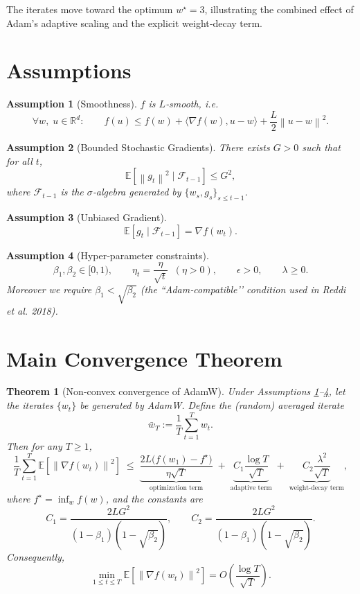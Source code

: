 \documentclass{article}
\newtheorem{assumption}{Assumption}
\newtheorem{theorem}{Theorem}
\newcommand{\EE}{\mathbb{E}}
\newcommand{\RR}{\mathbb{R}}
\newcommand{\norm}[1]{\left\|#1\right\|}
\begin{document}
The iterates move toward the optimum $w^\star=3$, illustrating the combined effect of Adam’s adaptive scaling and the explicit weight‑decay term.

\newpage
\section*{Assumptions}
\begin{assumption}[Smoothness]\label{ass:smooth}
$f$ is $L$‑smooth, i.e.
\[
    \forall w,\; u\in\RR^{d}:\qquad 
    f(u)\le f(w)+\langle \nabla f(w),u-w\rangle +\frac{L}{2}\norm{u-w}^{2}.
\]
\end{assumption}
\begin{assumption}[Bounded Stochastic Gradients]\label{ass:bound}
There exists $G>0$ such that for all $t$,
\[
    \EE\!\left[\norm{g_t}^{2}\mid\mathcal{F}_{t-1}\right]\le G^{2},
\]
where $\mathcal{F}_{t-1}$ is the $\sigma$‑algebra generated by $\{w_s,g_s\}_{s\le t-1}$.
\end{assumption}
\begin{assumption}[Unbiased Gradient]\label{ass:unbiased}
\[
    \EE\!\left[g_t\mid\mathcal{F}_{t-1}\right]=\nabla f(w_t).
\]
\end{assumption}
\begin{assumption}[Hyper‑parameter constraints]\label{ass:hyper}
\[
    \beta_1,\beta_2\in[0,1),\qquad
    \eta_t = \frac{\eta}{\sqrt{t}}\;\;( \eta>0),\qquad
    \epsilon>0,\qquad
    \lambda\ge0.
\]
Moreover we require $ \beta_1 < \sqrt{\beta_2}$ (the “Adam‑compatible’’ condition used in Reddi \emph{et al.} 2018).
\end{assumption}

\section*{Main Convergence Theorem}
\begin{theorem}[Non‑convex convergence of AdamW]\label{thm:adamw}
Under Assumptions \ref{ass:smooth}–\ref{ass:hyper}, let the iterates $\{w_t\}$ be generated by AdamW. Define the (random) averaged iterate
\[
    \bar w_T:=\frac{1}{T}\sum_{t=1}^{T} w_t .
\]
Then for any $T\ge 1$,
\[
    \frac{1}{T}\sum_{t=1}^{T}\EE\!\left[\norm{\nabla f(w_t)}^{2}\right]
    \;\le\;
    \underbrace{\frac{2L\bigl(f(w_1)-f^\star\bigr)}{\eta\sqrt{T}}}_{\text{optimization term}}
    \;+\;
    \underbrace{C_1\frac{\log T}{\sqrt{T}}}_{\text{adaptive term}}
    \;+\;
    \underbrace{C_2\frac{\lambda^{2}}{\sqrt{T}}}_{\text{weight‑decay term}},
\]
where $f^\star=\inf_w f(w)$, and the constants are
\[
    C_1 = \frac{2L G^{2}}{(1-\beta_1)(1-\sqrt{\beta_2})},\qquad
    C_2 = \frac{2L G^{2}}{(1-\beta_1)(1-\sqrt{\beta_2})}.
\]
Consequently,
\[
    \min_{1\le t\le T}\EE\!\left[\norm{\nabla f(w_t)}^{2}\right]
    = O\!\left(\frac{\log T}{\sqrt{T}}\right).
\]
\end{theorem}
\end{document}
